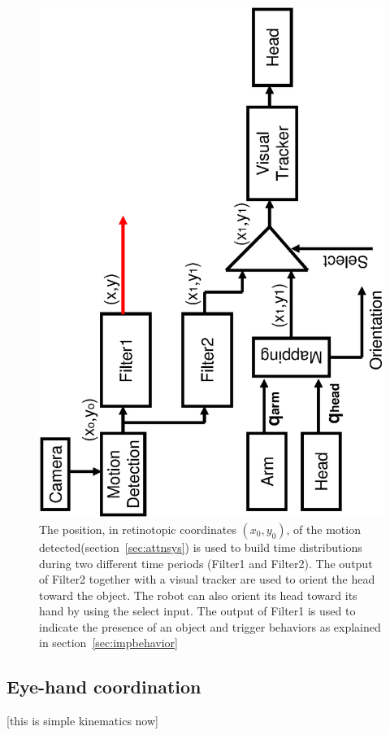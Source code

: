 \begin{figure}[htbp]
  \centerline{
    \includegraphics[height=\columnwidth, angle=270]{./figures/AttentionSystem.eps}
  }
  \caption[Diagram of the attention system]{The position, in
  retinotopic coordinates $(x_0,y_0)$, of the motion
  detected(section~\ref{sec:attnsys}) is used to build
  time distributions during two different time periods (Filter1
  and Filter2). The output of Filter2 together with a visual tracker
  are used to orient the head toward the object. The robot can also
  orient its head toward its hand by using the select input. The
  output of Filter1 is used to indicate the presence of an object
  and trigger behaviors as explained in section~\ref{sec:impbehavior}}
\label{fig:attnsys}
\end{figure}

\subsection{Eye-hand coordination}
[this is simple kinematics now]

%

